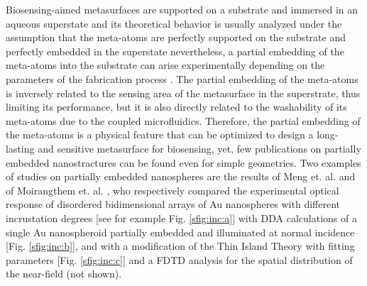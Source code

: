 Biosensing-aimed metasurfaces are supported on a substrate and immersed in an aqueous superstate \cite{estevez_trends_2014} and its theoretical behavior is usually analyzed under the assumption that the meta-atoms are perfectly supported on the substrate and perfectly embedded in the superstate  \cite{kabashin_plasmonic_2009,qiu_differential_2015,barrera1991optical,svedendahl_refractometric_2014,bedeaux_optical_2004} nevertheless, a partial embedding of the meta-atoms into the substrate can arise experimentally depending on the parameters of the fabrication process  \cite{meng_anisotropic_2015,moirangthem_enhanced_2012}. The partial embedding of the meta-atoms is inversely related to the sensing area of the metasurface in the superstrate, thus limiting its performance, but it is also directly related to the washability of its meta-atoms due to the coupled microfluidics. Therefore, the partial embedding of the meta-atoms is a physical feature that can be optimized to design a long-lasting and sensitive metasurface for biosensing, yet, few publications on partially embedded nanostractures can be found even for simple geometries. Two examples of studies on partially embedded nanospheres are the results of Meng et. al. \cite{meng_anisotropic_2015} and of Moirangthem et. al. \cite{moirangthem_enhanced_2012}, who respectively compared the experimental optical response of disordered bidimensional arrays of Au nanospheres with different incrustation degrees [see for example Fig. \ref{sfig:inc:a}] with DDA calculations of a single Au nanospheroid partially embedded and illuminated at normal incidence [Fig. \ref{sfig:inc:b}], and with a modification of the Thin Island Theory  with fitting parameters [Fig. \ref{sfig:inc:c}] and a FDTD analysis for the spatial distribution of the near-field (not shown).

